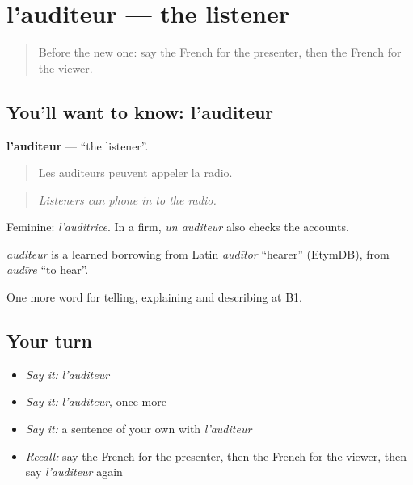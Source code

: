 \section[l'auditeur]{l'auditeur — the listener}

\label{lesson:FR-C280-auditeur}



\begin{quote}
Before the new one: say the French for the presenter, then the French for the viewer.
\end{quote}

\subsection*{You'll want to know: l'auditeur}
\textbf{l'auditeur} — \textquotedblleft{}the listener\textquotedblright{}.

\begin{quote}
Les auditeurs peuvent appeler la radio.
\end{quote}

\begin{quote}
\emph{Listeners can phone in to the radio.}
\end{quote}

Feminine: \emph{l'auditrice}. In a firm, \emph{un auditeur} also checks the accounts.

\begin{cousinweb}
\emph{auditeur} is a learned borrowing from Latin \emph{audītor} \textquotedblleft{}hearer\textquotedblright{} (EtymDB), from \emph{audīre} \textquotedblleft{}to hear\textquotedblright{}.
\end{cousinweb}

\begin{grammarlens}[title={What you've built}]
One more word for telling, explaining and describing at B1.
\end{grammarlens}

\subsection*{Your turn}
\begin{itemize}
\raggedright
  \item \emph{Say it:} \emph{l'auditeur}
  \item \emph{Say it:} \emph{l'auditeur}, once more
  \item \emph{Say it:} a sentence of your own with \emph{l'auditeur}
  \item \emph{Recall:} say the French for the presenter, then the French for the viewer, then say \emph{l'auditeur} again
\end{itemize}

